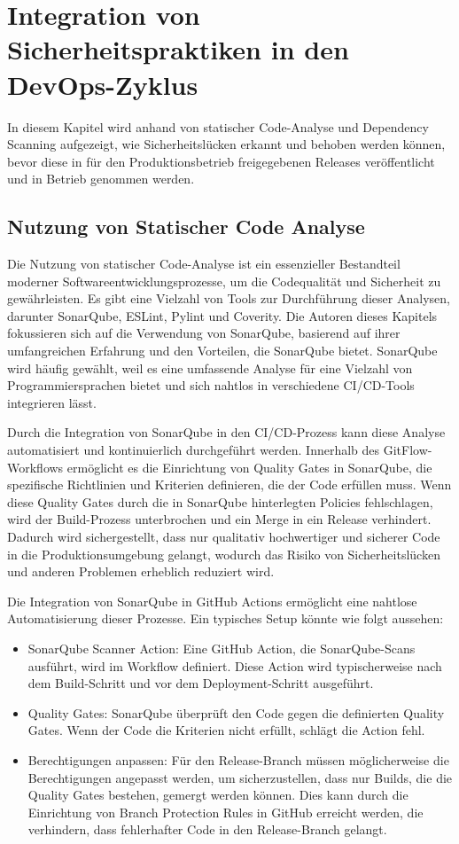\section{Integration von Sicherheitspraktiken in den DevOps-Zyklus}
In diesem Kapitel wird anhand von statischer Code-Analyse und Dependency Scanning aufgezeigt, wie Sicherheitslücken erkannt und behoben werden können, bevor diese in für den Produktionsbetrieb freigegebenen Releases veröffentlicht und in Betrieb genommen werden.


\subsection{Nutzung von Statischer Code Analyse}
Die Nutzung von statischer Code-Analyse ist ein essenzieller Bestandteil moderner Softwareentwicklungsprozesse, um die Codequalität und Sicherheit zu gewährleisten. Es gibt eine Vielzahl von Tools zur Durchführung dieser Analysen, darunter SonarQube, ESLint, Pylint und Coverity. Die Autoren dieses Kapitels fokussieren sich auf die Verwendung von SonarQube, basierend auf ihrer umfangreichen Erfahrung und den Vorteilen, die SonarQube bietet. SonarQube wird häufig gewählt, weil es eine umfassende Analyse für eine Vielzahl von Programmiersprachen bietet und sich nahtlos in verschiedene CI/CD-Tools integrieren lässt.

Durch die Integration von SonarQube in den CI/CD-Prozess kann diese Analyse automatisiert und kontinuierlich durchgeführt werden. Innerhalb des GitFlow-Workflows ermöglicht es die Einrichtung von Quality Gates in SonarQube, die spezifische Richtlinien und Kriterien definieren, die der Code erfüllen muss. Wenn diese Quality Gates durch die in SonarQube hinterlegten Policies fehlschlagen, wird der Build-Prozess unterbrochen und ein Merge in ein Release verhindert. Dadurch wird sichergestellt, dass nur qualitativ hochwertiger und sicherer Code in die Produktionsumgebung gelangt, wodurch das Risiko von Sicherheitslücken und anderen Problemen erheblich reduziert wird.

Die Integration von SonarQube in GitHub Actions ermöglicht eine nahtlose Automatisierung dieser Prozesse. Ein typisches Setup könnte wie folgt aussehen:

\begin{itemize}
\item SonarQube Scanner Action: Eine GitHub Action, die SonarQube-Scans ausführt, wird im Workflow definiert. Diese Action wird typischerweise nach dem Build-Schritt und vor dem Deployment-Schritt ausgeführt.
\item Quality Gates: SonarQube überprüft den Code gegen die definierten Quality Gates. Wenn der Code die Kriterien nicht erfüllt, schlägt die Action fehl.
\item Berechtigungen anpassen: Für den Release-Branch müssen möglicherweise die Berechtigungen angepasst werden, um sicherzustellen, dass nur Builds, die die Quality Gates bestehen, gemergt werden können. Dies kann durch die Einrichtung von Branch Protection Rules in GitHub erreicht werden, die verhindern, dass fehlerhafter Code in den Release-Branch gelangt.
\end{itemize}

